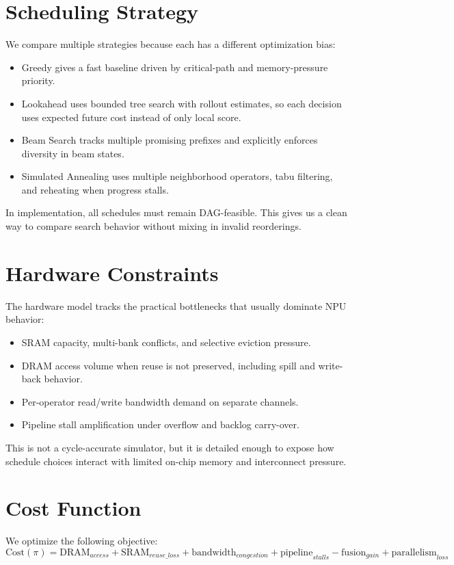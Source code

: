 \documentclass[11pt]{article}
\begin{document}
\section{Scheduling Strategy}
We compare multiple strategies because each has a different optimization bias:
\begin{itemize}
    \item Greedy gives a fast baseline driven by critical-path and memory-pressure priority.
    \item Lookahead uses bounded tree search with rollout estimates, so each decision uses expected future cost instead of only local score.
    \item Beam Search tracks multiple promising prefixes and explicitly enforces diversity in beam states.
    \item Simulated Annealing uses multiple neighborhood operators, tabu filtering, and reheating when progress stalls.
\end{itemize}

In implementation, all schedules must remain DAG-feasible. This gives us a clean way to compare search behavior without mixing in invalid reorderings.

\section{Hardware Constraints}
The hardware model tracks the practical bottlenecks that usually dominate NPU behavior:
\begin{itemize}
    \item SRAM capacity, multi-bank conflicts, and selective eviction pressure.
    \item DRAM access volume when reuse is not preserved, including spill and write-back behavior.
    \item Per-operator read/write bandwidth demand on separate channels.
    \item Pipeline stall amplification under overflow and backlog carry-over.
\end{itemize}

This is not a cycle-accurate simulator, but it is detailed enough to expose how schedule choices interact with limited on-chip memory and interconnect pressure.

\section{Cost Function}
We optimize the following objective:
\[
\text{Cost}(\pi)=
\text{DRAM}_{access} +
\text{SRAM}_{reuse\_loss} +
\text{bandwidth}_{congestion} +
\text{pipeline}_{stalls}
- \text{fusion}_{gain} +
\text{parallelism}_{loss}
\]
\end{document}
